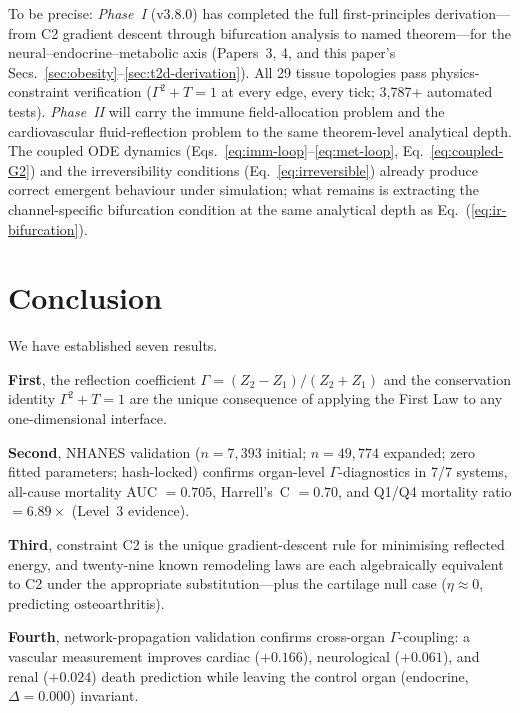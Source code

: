 \documentclass[aps,pre,twocolumn,superscriptaddress,floatfix]{revtex4-2}
\begin{document}
To be precise:
\emph{Phase~I} (v3.8.0) has completed
the full first-principles derivation---from
C2 gradient descent through bifurcation analysis
to named theorem---for the
neural--endocrine--metabolic axis
(Papers~3, 4, and this paper's
Secs.~\ref{sec:obesity}--\ref{sec:t2d-derivation}).
All 29 tissue topologies pass physics-constraint
verification ($\Gamma^2 + T = 1$ at every edge,
every tick; 3,787+ automated tests).
\emph{Phase~II} will carry the immune
field-allocation problem and the cardiovascular
fluid-reflection problem to the same
theorem-level analytical depth.
The coupled ODE dynamics
(Eqs.~\ref{eq:imm-loop}--\ref{eq:met-loop},
Eq.~\ref{eq:coupled-G2}) and the
irreversibility conditions
(Eq.~\ref{eq:irreversible}) already produce
correct emergent behaviour under simulation;
what remains is extracting the
channel-specific bifurcation condition at the
same analytical depth as
Eq.~(\ref{eq:ir-bifurcation}).


\section{Conclusion}
\label{sec:conclusion}

We have established seven results.

\textbf{First}, the reflection coefficient
$\Gamma = (Z_2-Z_1)/(Z_2+Z_1)$ and the conservation
identity $\Gamma^2 + T = 1$ are the unique consequence
of applying the First Law to any one-dimensional interface.

\textbf{Second}, NHANES validation ($n = 7{,}393$ initial;
$n = 49{,}774$ expanded; zero fitted parameters;
hash-locked) confirms organ-level $\Gamma$-diagnostics
in 7/7 systems, all-cause mortality AUC $= 0.705$,
Harrell's~C $= 0.70$, and Q1/Q4 mortality ratio
$= 6.89\times$ (Level~3 evidence).

\textbf{Third}, constraint C2 is the unique
gradient-descent rule for minimising reflected energy,
and twenty-nine known remodeling laws are each algebraically
equivalent to C2 under the appropriate substitution---plus
the cartilage null case ($\eta \approx 0$, predicting
osteoarthritis).

\textbf{Fourth}, network-propagation validation confirms
cross-organ $\Gamma$-coupling: a vascular measurement
improves cardiac ($+0.166$), neurological ($+0.061$),
and renal ($+0.024$) death prediction while leaving
the control organ (endocrine, $\Delta = 0.000$) invariant.
\end{document}
